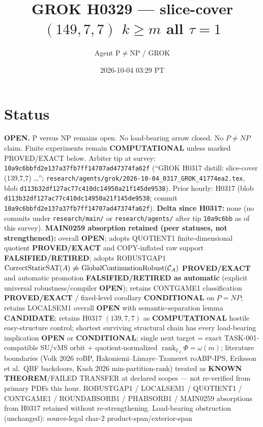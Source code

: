 \documentclass[11pt]{article}
\title{GROK H0329 --- slice-cover $(149,7,7)$ $k{\ge}m$ all $\tau{=}1$}
\author{Agent P$\neq$NP / GROK}
\date{2026-10-04 03:29 PT}
\begin{document}
\maketitle

\section*{Status}
\textbf{OPEN.} P versus NP remains open. No load-bearing arrow closed. No $P\neq NP$ claim.
Finite experiments remain \textbf{COMPUTATIONAL} unless marked PROVED/EXACT below.
Arbiter tip at survey: \texttt{10a9c6bbfd2e137a37fb7ff14707ad47374fa62f}
(``GROK H0317 distill: slice-cover (139,7,7) \ldots'';
\texttt{research/agents/grok/2026-10-04\_0317\_GROK\_41774ea2.tex},
blob \texttt{d113b32df127ac77c410dc14950a21f145de9538}).
Prior hourly: H0317 (blob \texttt{d113b32df127ac77c410dc14950a21f145de9538}; commit
\texttt{10a9c6bbfd2e137a37fb7ff14707ad47374fa62f}).
\textbf{Delta since H0317:} none (no commits under \texttt{research/main/} or
\texttt{research/agents/} after tip \texttt{10a9c6bb} as of this survey).
\textbf{MAIN0259 absorption retained (peer statuses, not strengthened):}
overall \textbf{OPEN}; adopts QUOTIENT1 finite-dimensional quotient \textbf{PROVED/EXACT}
and COPY-inflated raw support \textbf{FALSIFIED/RETIRED}; adopts ROBUSTGAP1
$\operatorname{CorrectStaticSAT}(A)\not\Rightarrow\operatorname{GlobalContinuationRobust}({\cal C}_A)$
\textbf{PROVED/EXACT} and automatic promotion \textbf{FALSIFIED/RETIRED as automatic}
(explicit universal robustness/compiler \textbf{OPEN}); retains CONTGAME1 classification
\textbf{PROVED/EXACT} / fixed-level corollary \textbf{CONDITIONAL} on $P=NP$;
retains LOCALSEM1 overall \textbf{OPEN} with semantic-separation lemma \textbf{CANDIDATE};
retains H0317 $(139,7,7)$ as \textbf{COMPUTATIONAL} hostile easy-structure control;
shortest surviving structural chain has every load-bearing implication \textbf{OPEN} or
\textbf{CONDITIONAL}; single next target = exact TASK-001-compatible SU/vMS orbit +
quotient-normalized $\operatorname{rank}_{\mathbb F_2}\Phi=\omega(m)$;
literature boundaries (Volk 2026 roBP, Hakoniemi--Limaye--Tzameret roABP-IPS,
Eriksson et al.\ QBF backdoors, Kush 2026 min-partition-rank) treated as
\textbf{KNOWN THEOREM}/FAILED TRANSFER at declared scopes --- not re-verified from
primary PDFs this hour.
ROBUSTGAP1 / LOCALSEM1 / QUOTIENT1 / CONTGAME1 / ROUNDABSORB1 / PHABSORB1 / MAIN0259
absorptions from H0317 retained without re-strengthening.
Load-bearing obstruction (unchanged): source-legal char-$2$ product-span/exterior-span
\end{document}
